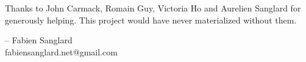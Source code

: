 Thanks to John Carmack, Romain Guy, Victoria Ho and Aurelien Sanglard for generously helping. This project would have never
materialized without them.\\ 
\par
-- Fabien Sanglard\\
fabiensanglard.net@gmail.com
